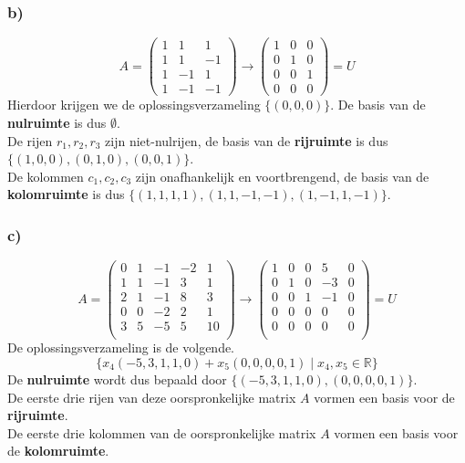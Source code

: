 \documentclass[lineaire_algebra_oplossingen.tex]{subfiles}
\begin{document}
\subsubsection*{b)}
\[
A =
\begin{pmatrix}
  1 & 1 & 1\\
  1 & 1 & -1\\
  1 & -1 & 1\\
  1 & -1 & -1
\end{pmatrix}
\longrightarrow
\begin{pmatrix}
  1 & 0 & 0\\
  0 & 1 & 0\\
  0 & 0 & 1\\
  0 & 0 & 0
\end{pmatrix}
= U
\]
Hierdoor krijgen we de oplossingsverzameling $\{(0,0,0)\}$. De basis van de \textbf{nulruimte} is dus $\emptyset$.\\
De rijen $r_1, r_2, r_3$ zijn niet-nulrijen, de basis van de \textbf{rijruimte} is dus $\{(1,0,0), (0,1,0), (0,0,1)\}$.\\
De kolommen $c_1, c_2, c_3$ zijn onafhankelijk en voortbrengend, de basis van de \textbf{kolomruimte} is dus $\{(1,1,1,1), (1,1,-1,-1), (1,-1,1,-1)\}$.

\subsubsection*{c)}
\[
A =
\begin{pmatrix}
0 & 1 & -1 &  -2 & 1 \\
1 & 1 & -1 & 3   & 1 \\
2 & 1 & -1 & 8   & 3 \\
0 & 0 & -2 & 2   & 1 \\
3 & 5 & -5 & 5   & 10\\
\end{pmatrix}
\longrightarrow
\begin{pmatrix}
1 & 0 & 0 & 5 & 0 \\
0 & 1 & 0 & -3& 0 \\
0 & 0 & 1 & -1& 0 \\
0 & 0 & 0 & 0 & 0 \\
0 & 0 & 0 & 0 & 0 \\
\end{pmatrix}
= U
\]
De oplossingsverzameling is de volgende.
\[
\{ x_4(-5,3,1,1,0) + x_5(0,0,0,0,1) \mid x_4, x_5 \in \mathbb{R}\}
\]
De \textbf{nulruimte} wordt dus bepaald door $\{ (-5,3,1,1,0) , (0,0,0,0,1) \}$.\\
De eerste drie rijen van deze oorspronkelijke matrix $A$ vormen een basis voor de \textbf{rijruimte}.\\
De eerste drie kolommen van de oorspronkelijke matrix $A$ vormen een basis voor de \textbf{kolomruimte}.
\end{document}
